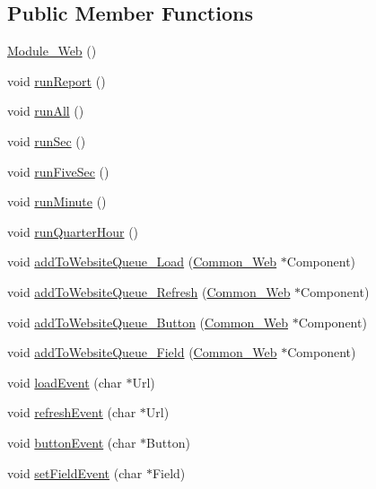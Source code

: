 \subsection*{Public Member Functions}
\begin{DoxyCompactItemize}
\item 
\hyperlink{class_module___web_ac0b37fdb18188955c71b17767cfe1b29}{Module\+\_\+\+Web} ()
\item 
void \hyperlink{class_module___web_a32622fc4e87a9885319c73c5b4802cc5}{run\+Report} ()
\item 
void \hyperlink{class_module___web_a1aa0d196cbc4ad14f561e1334a0ae98f}{run\+All} ()
\item 
void \hyperlink{class_module___web_adec2319a465bb9478e3699ce2d9612db}{run\+Sec} ()
\item 
void \hyperlink{class_module___web_a39cb72b8b1193e6a7d27d4ff414e07c6}{run\+Five\+Sec} ()
\item 
void \hyperlink{class_module___web_a580c12222077d148fe86cd0b07b263ec}{run\+Minute} ()
\item 
void \hyperlink{class_module___web_a89d99a5091a144203cc705deda0c0426}{run\+Quarter\+Hour} ()
\item 
void \hyperlink{class_module___web_a11f84c9609ed88d1bfcd869d64775e93}{add\+To\+Website\+Queue\+\_\+\+Load} (\hyperlink{class_common___web}{Common\+\_\+\+Web} $\ast$Component)
\item 
void \hyperlink{class_module___web_aee7880f65926af22ba1b83a73607e3b6}{add\+To\+Website\+Queue\+\_\+\+Refresh} (\hyperlink{class_common___web}{Common\+\_\+\+Web} $\ast$Component)
\item 
void \hyperlink{class_module___web_adadb1643a6b460c0d53a7341bb356ee1}{add\+To\+Website\+Queue\+\_\+\+Button} (\hyperlink{class_common___web}{Common\+\_\+\+Web} $\ast$Component)
\item 
void \hyperlink{class_module___web_a9f9ef9212523d06a130c5e9046b81adf}{add\+To\+Website\+Queue\+\_\+\+Field} (\hyperlink{class_common___web}{Common\+\_\+\+Web} $\ast$Component)
\item 
void \hyperlink{class_module___web_a319dfebbedf0114d2953d00fd1a33ad1}{load\+Event} (char $\ast$Url)
\item 
void \hyperlink{class_module___web_a2f07ae87a674532e854e6b5760411157}{refresh\+Event} (char $\ast$Url)
\item 
void \hyperlink{class_module___web_a522480d9045dd335a7679a7ab1c73b48}{button\+Event} (char $\ast$Button)
\item 
void \hyperlink{class_module___web_abd603f024a00f8fd3bfd646ec38d6997}{set\+Field\+Event} (char $\ast$Field)

\end{DoxyCompactItemize}

